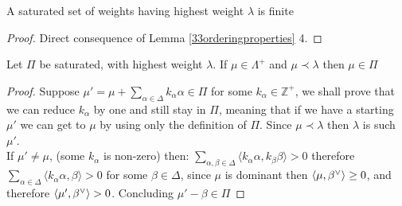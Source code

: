 \begin{lema}
	A saturated set of weights having highest weight $\lambda$ is finite 
\end{lema}
\begin{proof}
	Direct consequence of Lemma \ref{33orderingproperties} 4.
\end{proof}
\begin{prop}
	Let $\Pi$ be saturated, with highest weight $\lambda$. If $\mu \in \Lambda^+$ and $\mu\prec \lambda$ then $\mu \in \Pi$
\end{prop}
\begin{proof}
	Suppose $\mu' = \mu + \displaystyle	\sum_{\alpha \in \Delta} k_\alpha \alpha \in \Pi$ for some $k_\alpha \in \mathbb{Z}^+$, we shall prove that we can reduce $k_\alpha$ by one and still stay in $\Pi$, meaning that if we have a starting $\mu'$ we can get to $\mu$ by using only the definition of $\Pi$. Since $\mu \prec \lambda$ then $\lambda$ is such $\mu'$.\\
	If $\mu' \not= \mu$, (some $k_\alpha$ is non-zero) then: $\displaystyle\sum_{\alpha,\beta \in \Delta}\langle k_\alpha\alpha, k_\beta\beta\rangle > 0$ therefore $\displaystyle \sum_{\alpha \in \Delta} \langle k_\alpha\alpha,\beta \rangle >0$ for some $\beta \in \Delta$, since $\mu$ is dominant then $\langle {\mu},{\beta}^\lor\rangle \ge 0$, and therefore $\langle {\mu'},{\beta}^\lor\rangle > 0$. Concluding $\mu'-\beta \in \Pi$
\end{proof}
